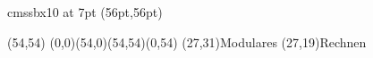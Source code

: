 

\font\myfont cmssbx10 at 7pt
\PapierGroesse(56pt,56pt)




\begin{psfigur}(54,54)
\psPolygon[fuellfarbe=0.753,eckradius=5,linienstil=](0,0)(54,0)(54,54)(0,54)
\psNeueSchicht
\rpin(27,31){\myfont Modulares}
\rpin(27,19){\myfont Rechnen}
\end{psfigur}
 
